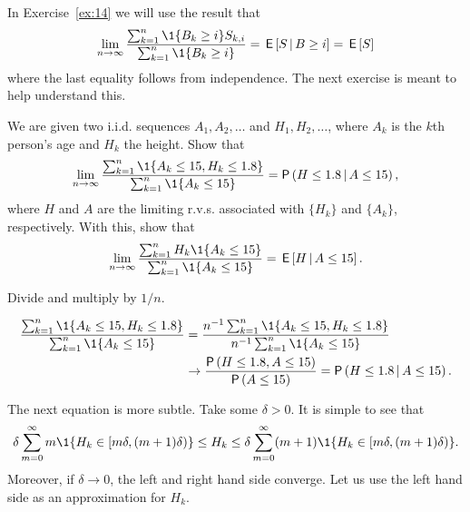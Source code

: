 In Exercise~\ref{ex:14} we will use the result that
\begin{equation*}
\lim_{n\to\infty} \frac{\sum_{k=1}^n \1{B_k\geq i} S_{k,i}}{\sum_{k=1}^n \1{B_k\geq i}} = 
\E{S \given B\geq i} = \E{S}
 \end{equation*}
where the last equality follows from independence.  The next exercise is meant to help understand this.

\begin{exercise}
We are given two i.i.d. sequences $A_1, A_2, \ldots $ and $H_1, H_2, \ldots$, where $A_k$ is the  $k$th person's age and $H_k$ the height. Show that
\begin{equation*}
\lim_{n\to\infty} 
\frac{  \sum_{k=1}^n \1{A_k\leq 15, H_k \leq 1.8}}{\sum_{k=1}^n \1{A_k \leq 15}} 
= \P{H\leq 1.8 \given A \leq 15},
\end{equation*}
where $H$ and $A$ are the limiting r.v.s. associated with $\{H_k\}$ and $\{A_k\}$, respectively. With this, show that
\begin{equation*}
  \lim_{n\to\infty} \frac{ \sum_{k=1}^n H_k \1{A_k\leq 15}}{\sum_{k=1}^n \1{A_k \leq 15}} = \E{H \given A\leq 15}.
\end{equation*}
\begin{hint}
  Divide and multiply by $1/n$. 
\end{hint}
\begin{solution}
\begin{equation*}
  \begin{split}
\frac{  \sum_{k=1}^n \1{A_k\leq 15, H_k \leq 1.8}}{\sum_{k=1}^n \1{A_k \leq 15}} 
&= \frac{ n^{-1} \sum_{k=1}^n \1{A_k\leq 15, H_k \leq 1.8}}{n^{-1}\sum_{k=1}^n \1{A_k \leq 15}} \\
&\to \frac{\P{H\leq 1.8, A\leq 15}}{\P{A\leq 15}} = \P{H\leq 1.8 \given A\leq 15}.
  \end{split}
\end{equation*}

The next equation is more subtle. Take some $\delta>0$. It is simple to see that
\begin{equation*}
\delta \sum_{m=0}^\infty m \1{H_k \in [m\delta, (m+1)\delta)}
\leq H_k \leq \delta \sum_{m=0}^\infty (m+1) \1{H_k \in [m\delta, (m+1)\delta)}.
\end{equation*}
Moreover, if $\delta\to 0$, the left and right hand side converge. Let us use the left hand side as an approximation for $H_k$. 


\end{solution}
\end{exercise}
